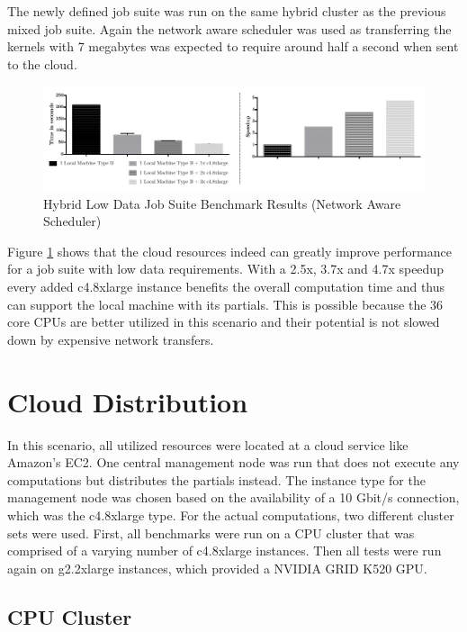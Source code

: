 The newly defined job suite was run on the same hybrid cluster as the previous mixed job suite. Again the network aware scheduler was used as transferring the kernels with 7 megabytes was expected to require around half a second when sent to the cloud.

\begin{figure}[!htb]
	\includegraphics[width=1.0\textwidth]{images/hybrid_lowdata_benchmark.pdf}
	\centering
	\caption{Hybrid Low Data Job Suite Benchmark Results (Network Aware Scheduler)}
	\label{img:hybrid_low_data_benchmark_results_network_aware}
\end{figure}

Figure \ref{img:hybrid_low_data_benchmark_results_network_aware} shows that the cloud resources indeed can greatly improve performance for a job suite with low data requirements. With a 2.5x, 3.7x and 4.7x speedup every added c4.8xlarge instance benefits the overall computation time and thus can support the local machine with its partials. This is possible because the 36 core CPUs are better utilized in this scenario and their potential is not slowed down by expensive network transfers.

\section{Cloud Distribution}

In this scenario, all utilized resources were located at a cloud service like Amazon's EC2. One central management node was run that does not execute any computations but distributes the partials instead. The instance type for the management node was chosen based on the availability of a 10 Gbit/s connection, which was the c4.8xlarge type. For the actual computations, two different cluster sets were used. First, all benchmarks were run on a CPU cluster that was comprised of a varying number of c4.8xlarge instances. Then all tests were run again on g2.2xlarge instances, which provided a NVIDIA GRID K520 GPU.

\subsection{CPU Cluster}
